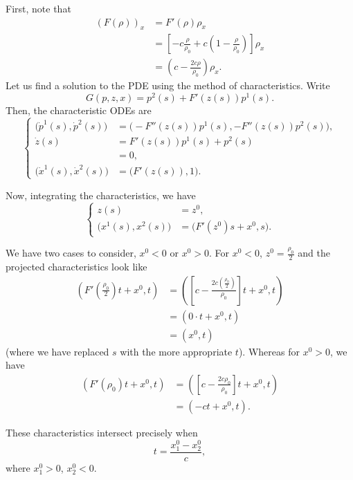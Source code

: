 \begin{solution*}
  First, note that
  \begin{align*}
    (F(\rho))_x
    &=F'(\rho)\rho_x\\
    &=\left[-c\frac{\rho}{\rho_0}+c\left(1-\frac{\rho}{\rho_0}\right)\right]\rho_x\\
    &=\left(c-\frac{2c\rho}{\rho_0}\right)\rho_x.
  \end{align*}
  Let us find a solution to the PDE using the method of
  characteristics. Write
  \[
    G(p,z,x)=p^2(s)+F'(z(s))p^1(s).
  \]
  Then, the characteristic ODEs are
  \[
    \left\{
      \begin{aligned}
        \bigl(\dot p^1(s),\dot p^2(s)\bigr)
        &=\bigl(-F''(z(s))p^1(s),-F''(z(s))p^2(s)\bigr),\\
        \dot z(s)
        &=F'(z(s))p^1(s)+p^2(s)\\
        &=0,\\
        \bigl(\dot x^1(s),\dot x^2(s)\bigr)
        &=\bigl(F'(z(s)),1\bigr).
      \end{aligned}
    \right.
  \]

  Now, integrating the characteristics, we have
  \[
    \left\{
      \begin{aligned}
         z(s)
        &=z^0,\\
        \bigl(x^1(s),x^2(s)\bigr)
        &=\bigl(F'(z^0)s+x^0,s\bigr).
      \end{aligned}
    \right.
  \]

  We have two cases to consider, \(x^0<0\) or \(x^0>0\). For \(x^0<0\),
  \(z^0=\frac{\rho_0}{2}\) and the projected characteristics look like
  \begin{align*}
    \left(
    F'(\tfrac{\rho_0}{2})t+x^0
    ,t\right)
    &=\left(
      \left[c-\frac{2c(\tfrac{\rho_0}{2})}{\rho_0}\right]t+x^0,t
      \right)\\
    &=(0\cdot t+x^0,t)\\
    &=(x^0,t)
  \end{align*}
  (where we have replaced \(s\) with the more appropriate \(t\)). Whereas
  for \(x^0>0\), we have
  \begin{align*}
    \left(
    F'(\rho_0)t+x^0
    ,t\right)
    &=\left(
       \left[c-\frac{2c\rho_0}{\rho_0}\right]t+x^0,t
      \right)\\
    &=(-ct+x^0,t).
  \end{align*}

  These characteristics intersect precisely when
  \[
    t=\frac{x_1^0-x_2^0}{c},
  \]
  where \(x_1^0>0\), \(x_2^0<0\).
\end{solution*}

